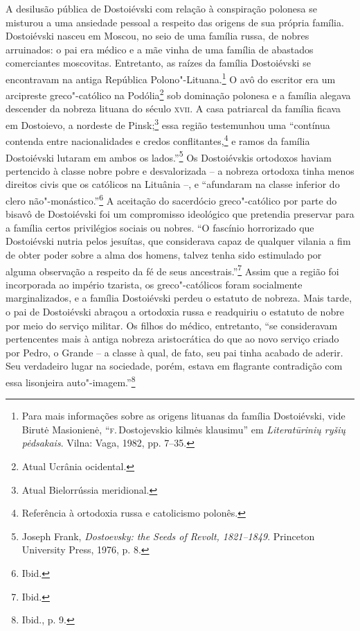 A desilusão pública de Dostoiévski com relação à conspiração polonesa se
misturou a uma ansiedade pessoal a respeito das origens de sua própria
família. Dostoiévski nasceu em Moscou, no seio de uma família russa, de
nobres arruinados: o pai era médico e a mãe vinha de uma família de
abastados comerciantes moscovitas. Entretanto, as raízes da família
Dostoiévski se encontravam na antiga República Polono"-Lituana.\footnote{Para mais informações sobre as origens lituanas da família Dostoiévski, vide Birutė Masionienė, ``\textsc{f}.\,Dostojevskio kilmės klausimu'' em \textit{Literatūrinių ryšių pėdsakais}. Vilna: Vaga, 1982, pp. 7--35.} O avô do escritor era um arcipreste greco"-católico na Podólia\footnote{Atual
Ucrânia ocidental.} sob dominação polonesa e a família alegava descender
da nobreza lituana do século \textsc{xvii}. A casa patriarcal da família ficava em
Dostoievo, a nordeste de Pinsk;\footnote{Atual Bielorrússia meridional.} essa
região testemunhou uma ``contínua contenda entre nacionalidades e credos
conflitantes,\footnote{Referência à ortodoxia russa e catolicismo polonês.} e ramos da família
Dostoiévski lutaram em ambos os lados.''\footnote{Joseph Frank, \textit{Dostoevsky: the Seeds of Revolt, 1821--1849}. Princeton University Press, 1976, p. 8.} Os Dostoiévskis ortodoxos haviam pertencido à classe nobre pobre e desvalorizada -- a nobreza ortodoxa
tinha menos direitos civis que os católicos na Lituânia --, e ``afundaram
na classe inferior do clero não"-monástico.''\footnote{Ibid.} A aceitação
do sacerdócio greco"-católico por parte do bisavô de Dostoiévski foi um
compromisso ideológico que pretendia preservar para a família certos
privilégios sociais ou nobres. ``O fascínio horrorizado que Dostoiévski
nutria pelos jesuítas, que considerava capaz de qualquer vilania a fim
de obter poder sobre a alma dos homens, talvez tenha sido estimulado por
alguma observação a respeito da fé de seus ancestrais.''\footnote{Ibid.}
Assim que a região foi incorporada ao império tzarista, os
greco"-católicos foram socialmente marginalizados, e a família
Dostoiévski perdeu o estatuto de nobreza. Mais tarde, o pai de
Dostoiévski abraçou a ortodoxia russa e readquiriu o estatuto de nobre
por meio do serviço militar. Os filhos do médico, entretanto, ``se
consideravam pertencentes mais à antiga nobreza aristocrática do que ao
novo serviço criado por Pedro, o Grande -- a classe à qual, de fato, seu
pai tinha acabado de aderir. Seu verdadeiro lugar na sociedade, porém,
estava em flagrante contradição com essa lisonjeira
auto"-imagem.''\footnote{Ibid., p. 9.}

